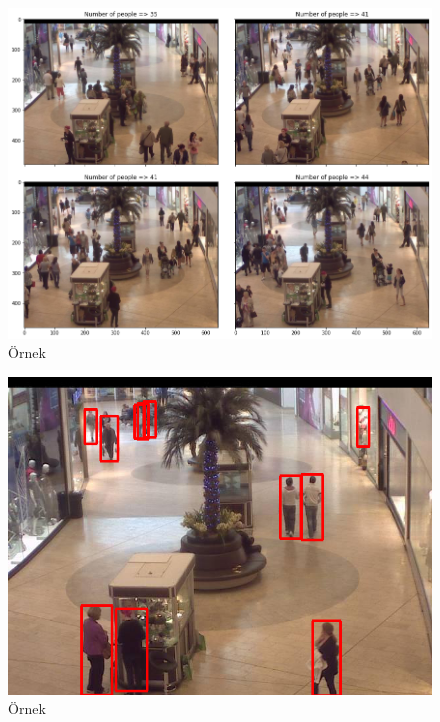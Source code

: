 \documentclass[10pt,a4paper]{report}
\begin{document}
	 	\begin{figure}[!h]
			
			\raggedright
			\includegraphics[width=\textwidth]{Ornek_sonuc1.png}
			\caption{Örnek}
			\label{Ornek_sonuc1}
		\end{figure}
		
		\begin{figure}[!h]
			
			\raggedright
			\includegraphics[width=\textwidth]{Ornek_sonuc2.png}
			\caption{Örnek}
			\label{Ornek_sonuc2}
		\end{figure}
		
		
\end{document}
